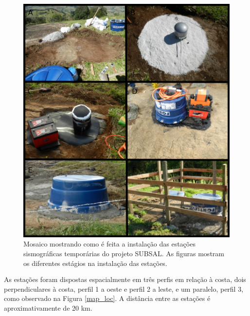 \begin{figure}[!ht]
\centering
\includegraphics[scale=0.45]{Figs/instalacao.png}
\caption[Mosaico mostrando como é feita a instalação das estações sismográficas temporárias do projeto SUBSAL.]{Mosaico mostrando como é feita a instalação das estações sismográficas temporárias do projeto SUBSAL. As figuras mostram os diferentes estágios na instalação das estações.}
\label{instalacao}
\end{figure} 

As estações foram dispostas espacialmente em três perfis em relação à costa, dois perpendiculares à costa, perfil 1 a oeste e perfil 2 a leste, e um paralelo, perfil 3, como observado na Figura \ref{map_loc}. A distância entre as estações é aproximativamente de 20 km.

